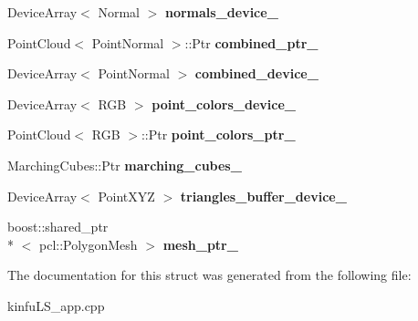 \begin{DoxyCompactItemize}
\item 
\hypertarget{struct_scene_cloud_view_abc47fcd6b165052111ee0f13bad7c494}{Device\+Array$<$ Normal $>$ {\bfseries normals\+\_\+device\+\_\+}}\label{struct_scene_cloud_view_abc47fcd6b165052111ee0f13bad7c494}

\item 
\hypertarget{struct_scene_cloud_view_a06b25d903ac89d7b74587d0ba462a8b2}{Point\+Cloud$<$ Point\+Normal $>$\+::Ptr {\bfseries combined\+\_\+ptr\+\_\+}}\label{struct_scene_cloud_view_a06b25d903ac89d7b74587d0ba462a8b2}

\item 
\hypertarget{struct_scene_cloud_view_abbbdc32d1bb7209155c3cb3825f27f8c}{Device\+Array$<$ Point\+Normal $>$ {\bfseries combined\+\_\+device\+\_\+}}\label{struct_scene_cloud_view_abbbdc32d1bb7209155c3cb3825f27f8c}

\item 
\hypertarget{struct_scene_cloud_view_a2dff41d6e0d5aa60d2aaf9093f8c426c}{Device\+Array$<$ R\+G\+B $>$ {\bfseries point\+\_\+colors\+\_\+device\+\_\+}}\label{struct_scene_cloud_view_a2dff41d6e0d5aa60d2aaf9093f8c426c}

\item 
\hypertarget{struct_scene_cloud_view_ab36241eff4589d5f71d6b29479ed515d}{Point\+Cloud$<$ R\+G\+B $>$\+::Ptr {\bfseries point\+\_\+colors\+\_\+ptr\+\_\+}}\label{struct_scene_cloud_view_ab36241eff4589d5f71d6b29479ed515d}

\item 
\hypertarget{struct_scene_cloud_view_a41caf132565c412c864df30073434128}{Marching\+Cubes\+::\+Ptr {\bfseries marching\+\_\+cubes\+\_\+}}\label{struct_scene_cloud_view_a41caf132565c412c864df30073434128}

\item 
\hypertarget{struct_scene_cloud_view_af3eb6dd80adb3f9f1fa8274dedbb328a}{Device\+Array$<$ Point\+X\+Y\+Z $>$ {\bfseries triangles\+\_\+buffer\+\_\+device\+\_\+}}\label{struct_scene_cloud_view_af3eb6dd80adb3f9f1fa8274dedbb328a}

\item 
\hypertarget{struct_scene_cloud_view_a9392ddca29861ec78da5a31fc553988d}{boost\+::shared\+\_\+ptr\\*
$<$ pcl\+::\+Polygon\+Mesh $>$ {\bfseries mesh\+\_\+ptr\+\_\+}}\label{struct_scene_cloud_view_a9392ddca29861ec78da5a31fc553988d}

\end{DoxyCompactItemize}


The documentation for this struct was generated from the following file\+:\begin{DoxyCompactItemize}
\item 
kinfu\+L\+S\+\_\+app.\+cpp\end{DoxyCompactItemize}
